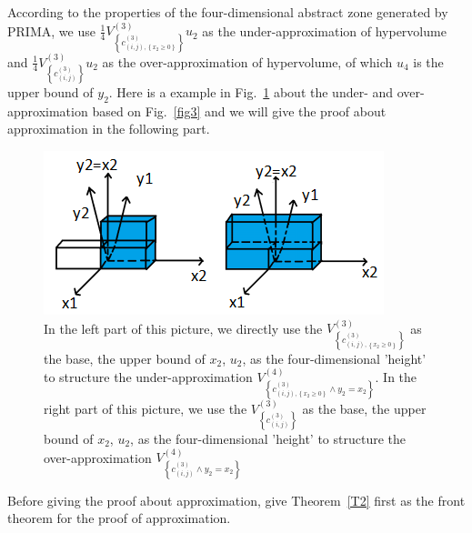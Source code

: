 \documentclass[runningheads]{llncs}
\begin{document}
According to the properties of the four-dimensional abstract zone generated by PRIMA, we use $\frac{1}{4}V^{(3)}_{\left \{c^{(3)}_{\left ( i,j\right ),\left \{x_{2}\geq 0\right \}}\right \}}u_{2}$ as the under-approximation of hypervolume and $\frac{1}{4}V^{(3)}_{\left \{c^{(3)}_{( i,j)}\right \}}u_{2}$ as the over-approximation of hypervolume, of which $u_{4}$ is the upper bound of $y_{2}$. Here is a example in Fig.~\ref{fig4} about the under- and over- approximation based on Fig.~\ref{fig3} and we will give the proof about approximation in the following part.

\begin{figure}
\includegraphics[width=\textwidth]{Fig/FigR2_2.png}
\caption{In the left part of this picture, we directly use the $V^{(3)}_{\left \{c^{(3)}_{\left ( i,j\right ),\left \{x_{2}\geq 0\right \}}\right \}}$ as the base, the upper bound of $x_{2}$, $u_{2}$, as the four-dimensional 'height' to structure the under-approximation $V^{(4)}_{ \left \{ c^{(3)}_{\left ( i,j\right ),\left \{x_{2}\geq 0\right \}}\wedge y_{2}=x_{2}\right \} }$. In the right part of this picture, we use the $V^{(3)}_{\left \{c^{(3)}_{\left ( i,j\right )}\right \}}$ as the base, the upper bound of $x_{2}$, $u_{2}$, as the four-dimensional 'height' to structure the over-approximation $V^{(4)}_{ \left \{ c^{(3)}_{\left ( i,j\right )}\wedge y_{2}=x_{2}\right \} }$} \label{fig4}
\end{figure}

Before giving the proof about approximation, give Theorem~\ref{T2} first as the front theorem for the proof of approximation.
\end{document}
